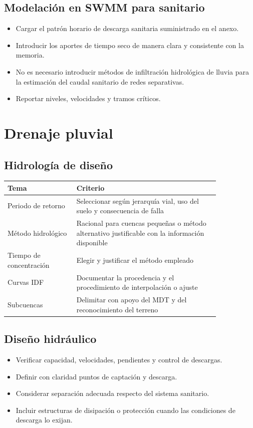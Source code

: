 \documentclass[11pt]{article}
\begin{document}
\subsection{Modelaci\'on en SWMM para sanitario}
\begin{itemize}
\item Cargar el patr\'on horario de descarga sanitaria suministrado en el anexo.
\item Introducir los aportes de tiempo seco de manera clara y consistente con la memoria.
\item No es necesario introducir m\'etodos de infiltraci\'on hidrol\'ogica de lluvia para la estimaci\'on del caudal sanitario de redes separativas.
\item Reportar niveles, velocidades y tramos cr\'iticos.
\end{itemize}

\section{Drenaje pluvial}
\subsection{Hidrolog\'ia de dise\~no}
\begin{center}
\begin{tabular}{p{0.27\linewidth} p{0.57\linewidth}}
\toprule
\textbf{Tema} & \textbf{Criterio} \\
\midrule
Periodo de retorno & Seleccionar seg\'un jerarqu\'ia vial, uso del suelo y consecuencia de falla \\
M\'etodo hidrol\'ogico & Racional para cuencas peque\~nas o m\'etodo alternativo justificable con la informaci\'on disponible \\
Tiempo de concentraci\'on & Elegir y justificar el m\'etodo empleado \\
Curvas IDF & Documentar la procedencia y el procedimiento de interpolaci\'on o ajuste \\
Subcuencas & Delimitar con apoyo del MDT y del reconocimiento del terreno \\
\bottomrule
\end{tabular}
\end{center}

\subsection{Dise\~no hidr\'aulico}
\begin{itemize}
\item Verificar capacidad, velocidades, pendientes y control de descargas.
\item Definir con claridad puntos de captaci\'on y descarga.
\item Considerar separaci\'on adecuada respecto del sistema sanitario.
\item Incluir estructuras de disipaci\'on o protecci\'on cuando las condiciones de descarga lo exijan.
\end{itemize}
\end{document}
